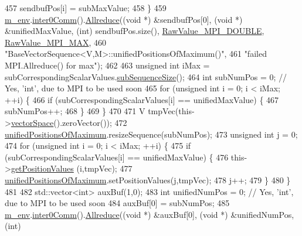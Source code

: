 \begin{DoxyCode}
457     sendbufPos[i] = subMaxValue;
458   \}
459   \hyperlink{class_q_u_e_s_o_1_1_base_vector_sequence_a8e8824d2a63c5a43bcc6473e3a0491e8}{m\_env}.\hyperlink{class_q_u_e_s_o_1_1_base_environment_a689e4d140c74d495d97eb498714a4b82}{inter0Comm}().\hyperlink{class_q_u_e_s_o_1_1_mpi_comm_a72e137e60ef8060efb1ee5fc874fa4b8}{Allreduce}((\textcolor{keywordtype}{void} *) &sendbufPos[0], (\textcolor{keywordtype}{void} *) &unifiedMaxValue, 
      (\textcolor{keywordtype}{int}) sendbufPos.size(), \hyperlink{_mpi_comm_8h_ad0f503bd9fecfe4e570ca3d15aaf2518}{RawValue\_MPI\_DOUBLE}, \hyperlink{_mpi_comm_8h_a68f3ac7ff71a6504e236b0c95de78178}{RawValue\_MPI\_MAX},
460                                \textcolor{stringliteral}{"BaseVectorSequence<V,M>::unifiedPositionsOfMaximum()"},
461                                \textcolor{stringliteral}{"failed MPI.Allreduce() for max"});
462 
463   \textcolor{keywordtype}{unsigned} \textcolor{keywordtype}{int} iMax = subCorrespondingScalarValues.\hyperlink{class_q_u_e_s_o_1_1_scalar_sequence_a0288ea295eedc216a1617b3286f6f3a0}{subSequenceSize}();
464   \textcolor{keywordtype}{int} subNumPos = 0; \textcolor{comment}{// Yes, 'int', due to MPI to be used soon}
465   \textcolor{keywordflow}{for} (\textcolor{keywordtype}{unsigned} \textcolor{keywordtype}{int} i = 0; i < iMax; ++i) \{
466     \textcolor{keywordflow}{if} (subCorrespondingScalarValues[i] == unifiedMaxValue) \{
467       subNumPos++;
468     \}
469   \}
470 
471   V tmpVec(this->\hyperlink{class_q_u_e_s_o_1_1_base_vector_sequence_af9a4dd979a2fa8dee85bb07793b59ba2}{vectorSpace}().zeroVector());
472   \hyperlink{class_q_u_e_s_o_1_1_base_vector_sequence_a4269482101b2bcdb1975543f8191ab4c}{unifiedPositionsOfMaximum}.resizeSequence(subNumPos);
473   \textcolor{keywordtype}{unsigned} \textcolor{keywordtype}{int} j = 0;
474   \textcolor{keywordflow}{for} (\textcolor{keywordtype}{unsigned} \textcolor{keywordtype}{int} i = 0; i < iMax; ++i) \{
475     \textcolor{keywordflow}{if} (subCorrespondingScalarValues[i] == unifiedMaxValue) \{
476       this->\hyperlink{class_q_u_e_s_o_1_1_base_vector_sequence_a656d47a18b401d6d914b0daf2dea88b0}{getPositionValues}                    (i,tmpVec);
477       \hyperlink{class_q_u_e_s_o_1_1_base_vector_sequence_a4269482101b2bcdb1975543f8191ab4c}{unifiedPositionsOfMaximum}.setPositionValues(j,tmpVec);
478       j++;
479     \}
480   \}
481 
482   std::vector<int> auxBuf(1,0);
483   \textcolor{keywordtype}{int} unifiedNumPos = 0; \textcolor{comment}{// Yes, 'int', due to MPI to be used soon}
484   auxBuf[0] = subNumPos;
485   \hyperlink{class_q_u_e_s_o_1_1_base_vector_sequence_a8e8824d2a63c5a43bcc6473e3a0491e8}{m\_env}.\hyperlink{class_q_u_e_s_o_1_1_base_environment_a689e4d140c74d495d97eb498714a4b82}{inter0Comm}().\hyperlink{class_q_u_e_s_o_1_1_mpi_comm_a72e137e60ef8060efb1ee5fc874fa4b8}{Allreduce}((\textcolor{keywordtype}{void} *) &auxBuf[0], (\textcolor{keywordtype}{void} *) &unifiedNumPos, (\textcolor{keywordtype}{int}) 

\end{DoxyCode}
